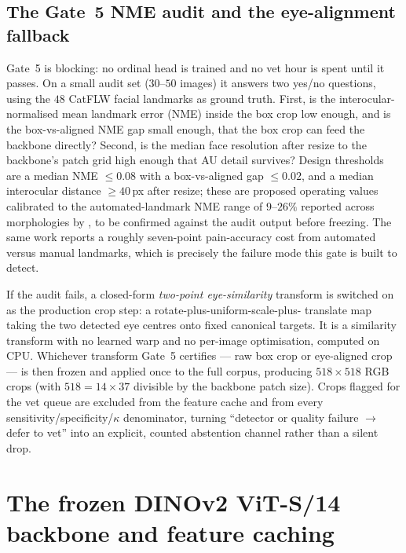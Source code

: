 \subsection{The Gate~5 NME audit and the eye-alignment fallback}
\label{sec:eng-crop-gate5}

Gate~5 is blocking: no ordinal head is trained and no vet hour is spent until it
passes. On a small audit set ($30$--$50$ images) it answers two yes/no
questions, using the $48$ CatFLW facial landmarks \citep{martvel2024catflw} as
ground truth. First, is the interocular-normalised mean landmark error (NME)
inside the box crop low enough, and is the box-vs-aligned NME gap small enough,
that the box crop can feed the backbone directly? Second, is the median face
resolution after resize to the backbone's patch grid high enough that AU detail
survives? Design thresholds are a median NME $\leq 0.08$ with a box-vs-aligned
gap $\leq 0.02$, and a median interocular distance $\geq 40$\,px after resize;
these are proposed operating values calibrated to the automated-landmark NME
range of $9$--$26\%$ reported across morphologies by \citet{martvel2024catflw},
to be confirmed against the audit output before freezing. The same work reports
a roughly seven-point pain-accuracy cost from automated versus manual landmarks,
which is precisely the failure mode this gate is built to detect.

If the audit fails, a closed-form \emph{two-point eye-similarity} transform is
switched on as the production crop step: a rotate-plus-uniform-scale-plus-%
translate map taking the two detected eye centres onto fixed canonical targets.
It is a similarity transform with no learned warp and no per-image optimisation,
computed on CPU. Whichever transform Gate~5 certifies --- raw box crop or
eye-aligned crop --- is then frozen and applied once to the full corpus,
producing $518\times518$ RGB crops (with $518 = 14\times 37$ divisible by the
backbone patch size). Crops flagged for the vet queue are excluded from the
feature cache and from every sensitivity/specificity/$\kappa$ denominator,
turning ``detector or quality failure $\rightarrow$ defer to vet'' into an
explicit, counted abstention channel rather than a silent drop.

\section{The frozen DINOv2 ViT-S/14 backbone and feature caching}
\label{sec:eng-backbone}

